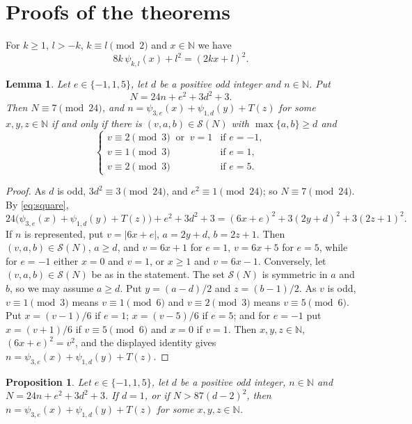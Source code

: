 \documentclass[11pt]{amsart}
\newtheorem{lemma}[theorem]{Lemma}
\newtheorem{proposition}[theorem]{Proposition}
\theoremstyle{definition}
\theoremstyle{remark}
\newcommand{\N}{\mathbb{N}}
\newcommand{\cS}{\mathcal{S}}
\newcommand{\Tr}{T}
\begin{document}
\section{Proofs of the theorems}\label{sec:proofs}

For $k\ge 1$, $l>-k$, $k\equiv l\pmod 2$ and $x\in\N$ we have
\begin{equation}\label{eq:square}
8k\,\psi_{k,l}(x)+l^2=(2kx+l)^2 .
\end{equation}

\begin{lemma}\label{lem:reduce}
Let $e\in\{-1,1,5\}$, let $d$ be a positive odd integer and $n\in\N$. Put
\[
N=24n+e^2+3d^2+3 .
\]
Then $N\equiv 7\pmod{24}$, and $n=\psi_{3,e}(x)+\psi_{1,d}(y)+\Tr(z)$ for some $x,y,z\in\N$
if and only if there is $(v,a,b)\in\cS(N)$ with $\max\{a,b\}\ge d$ and
\[
\begin{cases}
v\equiv 2\pmod 3 \ \text{ or } \ v=1 & \text{if } e=-1,\\
v\equiv 1\pmod 3 & \text{if } e=1,\\
v\equiv 2\pmod 3 & \text{if } e=5.
\end{cases}
\]
\end{lemma}

\begin{proof}
As $d$ is odd, $3d^2\equiv 3\pmod{24}$, and $e^2\equiv 1\pmod{24}$; so $N\equiv 7\pmod{24}$.
By \eqref{eq:square},
\[
24\bigl(\psi_{3,e}(x)+\psi_{1,d}(y)+\Tr(z)\bigr)+e^2+3d^2+3=(6x+e)^2+3(2y+d)^2+3(2z+1)^2 .
\]
If $n$ is represented, put $v=|6x+e|$, $a=2y+d$, $b=2z+1$. Then $(v,a,b)\in\cS(N)$, $a\ge d$, and
$v=6x+1$ for $e=1$, $v=6x+5$ for $e=5$, while for $e=-1$ either $x=0$ and $v=1$, or $x\ge 1$ and $v=6x-1$.
Conversely, let $(v,a,b)\in\cS(N)$ be as in the statement. The set $\cS(N)$ is symmetric in $a$ and $b$, so we may assume $a\ge d$.
Put $y=(a-d)/2$ and $z=(b-1)/2$. As $v$ is odd, $v\equiv 1\pmod 3$ means $v\equiv 1\pmod 6$ and $v\equiv 2\pmod 3$ means $v\equiv 5\pmod 6$.
Put $x=(v-1)/6$ if $e=1$; $x=(v-5)/6$ if $e=5$; and for $e=-1$ put $x=(v+1)/6$ if $v\equiv 5\pmod 6$ and $x=0$ if $v=1$.
Then $x,y,z\in\N$, $(6x+e)^2=v^2$, and the displayed identity gives $n=\psi_{3,e}(x)+\psi_{1,d}(y)+\Tr(z)$.
\end{proof}

\begin{proposition}\label{prop:family}
Let $e\in\{-1,1,5\}$, let $d$ be a positive odd integer, $n\in\N$ and $N=24n+e^2+3d^2+3$.
If $d=1$, or if $N>87(d-2)^2$, then $n=\psi_{3,e}(x)+\psi_{1,d}(y)+\Tr(z)$ for some $x,y,z\in\N$.
\end{proposition}
\end{document}
